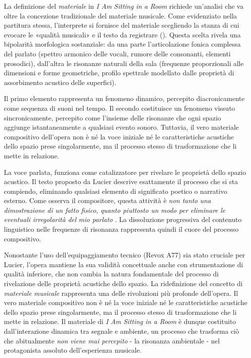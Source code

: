 La definizione del \textit{materiale} in \textit{I Am Sitting in a Room} richiede un'analisi che va oltre la concezione tradizionale del materiale musicale. Come evidenziato nella partitura stessa, l'interprete si fornisce del materiale scegliendo la stanza di cui evocare le «qualità musicali» e il testo da registrare (\cite{Lucier1995}). Questa scelta rivela una bipolarità morfologica sostanziale: da una parte l'articolazione fonica complessa del parlato (spettro armonico delle vocali, rumore delle consonanti, elementi prosodici), dall'altra le risonanze naturali della sala (frequenze proporzionali alle dimensioni e forme geometriche, profilo spettrale modellato dalle proprietà di assorbimento acustico delle superfici).

Il primo elemento rappresenta un fenomeno dinamico, percepito diacronicamente come sequenza di suoni nel tempo. Il secondo costituisce un fenomeno vissuto sincronicamente, percepito come l'insieme delle risonanze che ogni spazio aggiunge istantaneamente a qualsiasi evento sonoro. Tuttavia, il vero materiale compositivo dell'opera non è né la voce iniziale né le caratteristiche acustiche dello spazio prese singolarmente, ma il processo stesso di trasformazione che li mette in relazione.

La voce parlata, funziona come catalizzatore per rivelare le proprietà dello spazio acustico. Il testo proposto da Lucier descrive esattamente il processo che si sta compiendo, eliminando qualsiasi elemento di significato poetico o narrativo esterno. Come osserva il compositore, questa attività è \textit{non tanto una dimostrazione di un fatto fisico, quanto piuttosto un modo per eliminare le eventuali irregolarità del mio parlato} . La dissoluzione progressiva del contenuto linguistico nelle frequenze di risonanza rappresenta quindi il cuore del processo compositivo.

Nonostante l'uso dell'equipaggiamento tecnico (Revox A77) sia stato cruciale per Lucier, l'opera mantiene la sua validità concettuale anche con strumentazione di qualità inferiore, che non cambia la natura fondamentale del processo di rivelazione delle proprietà acustiche dello spazio. La ridefinizione del concetto di \textit{materiale musicale} rappresenta una delle rivoluzioni più profonde dell'opera. Il vero materiale compositivo non è né la voce iniziale né le caratteristiche acustiche dello spazio prese singolarmente, ma il processo stesso di trasformazione che li mette in relazione. Il materiale di \textit{I Am Sitting in a Room} è dunque costituito dall'interazione dinamica tra segnale e ambiente, un processo che trasforma ciò che abitualmente \textit{non viene mai percepito} - la risonanza ambientale - nel protagonista assoluto dell'esperienza musicale.